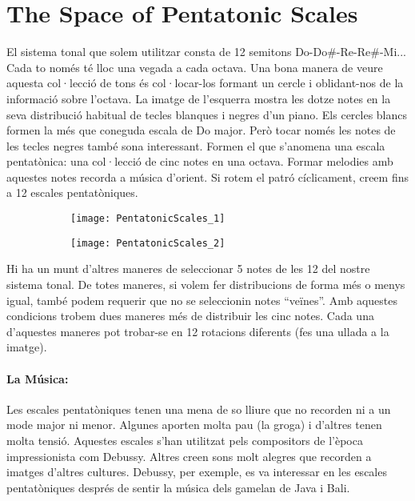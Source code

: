 \section{The Space of Pentatonic Scales}
El sistema tonal que solem utilitzar consta de 12 semitons Do-Do\#-Re-Re\#-Mi... Cada to només té lloc una vegada a cada octava. Una bona manera de veure aquesta col·lecció de tons és col·locar-los formant un cercle i oblidant-nos de la informació sobre l'octava.  La imatge de l'esquerra mostra les dotze notes en la seva distribució habitual de tecles blanques i negres d'un piano. Els cercles blancs formen la més que coneguda escala de Do major. Però tocar només les notes de les tecles negres també sona interessant. Formen el que s'anomena una escala pentatònica: una col·lecció de cinc notes en una octava. Formar melodies amb aquestes notes recorda a música d'orient. Si rotem el patró cíclicament, creem fins a 12 escales pentatòniques.


\begin{figure}[h]
\centering
\begin{subfigure}{0.45\textwidth}
\centering
\texttt{[image: PentatonicScales\_1]}
\end{subfigure}
\begin{subfigure}{0.45\textwidth}
\centering
\texttt{[image: PentatonicScales\_2]}
\end{subfigure}
\end{figure}

Hi ha un munt d'altres maneres de seleccionar 5 notes de les 12 del nostre sistema tonal. De totes maneres, si volem fer distribucions de forma més o menys igual, també podem requerir que no se seleccionin notes ``veïnes''. Amb aquestes condicions trobem dues maneres més de distribuir les cinc notes. Cada una d'aquestes maneres pot trobar-se en 12 rotacions diferents (fes una ullada a la imatge).

\paragraph{La Música:} Les escales pentatòniques tenen una mena de so lliure que no recorden ni a un mode major ni menor. Algunes aporten molta pau (la groga) i d'altres tenen molta tensió. Aquestes escales s'han utilitzat pels compositors de l'època impressionista com Debussy. Altres creen sons molt alegres que recorden a imatges d'altres cultures. Debussy, per exemple, es va interessar en les escales pentatòniques després de sentir la música dels gamelan de Java i Bali.

